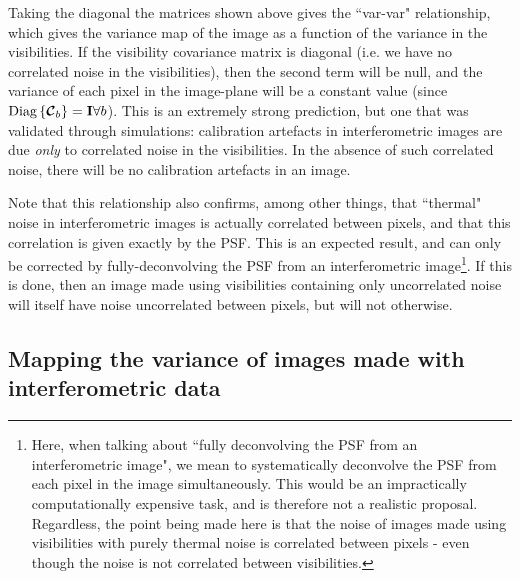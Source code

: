\pg
Taking the diagonal the matrices shown above gives the ``var-var" relationship, which gives the variance map of the image as a function of the variance in the visibilities. If the visibility covariance matrix is diagonal (i.e. we have no correlated noise in the visibilities), then the second term will be null, and the variance of each pixel in the image-plane will be a constant value (since $\text{Diag}\left\{\bm{\mathcal{C}}_b\right\}=\bm{\mathrm{I}}\forall b$). This is an extremely strong prediction, but one that was validated through simulations: calibration artefacts in interferometric images are due \textit{only} to correlated noise in the visibilities. In the absence of such correlated noise, there will be no calibration artefacts in an image.

\pg
Note that this relationship also confirms, among other things, that ``thermal" noise in interferometric images is actually correlated between pixels, and that this correlation is given exactly by the PSF. This is an expected result, and can only be corrected by fully-deconvolving the PSF from an interferometric image\footnote{Here, when talking about ``fully deconvolving the PSF from an interferometric image", we mean to systematically deconvolve the PSF from each pixel in the image simultaneously. This would be an impractically computationally expensive task, and is therefore not a realistic proposal. Regardless, the point being made here is that the noise of images made using visibilities with purely thermal noise is correlated between pixels - even though the noise is not correlated between visibilities.}. If this is done, then an image made using visibilities containing only uncorrelated noise will itself have noise uncorrelated between pixels, but will not otherwise.

\pg
%


\subsection{Mapping the variance of images made with interferometric data}

